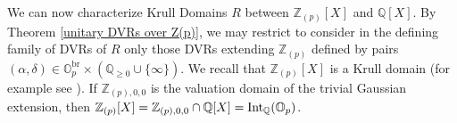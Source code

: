 \documentclass[10pt]{article}
\numberwithin{equation}{section}
\theoremstyle{definition}
\theoremstyle{definition}
\newcommand{\Q}{\mathbb{Q}}
\newcommand{\Z}{\mathbb{Z}}
\renewcommand{\O}{\mathbb{O}}
\newcommand{\Int}{\textnormal{Int}}
\newcommand{\IntQ}{\Int_{\Q}}
\newcommand{\oQp}{\overline{\Q_p}}
\newcommand{\br}{\text{br}}
\begin{document}

We can now characterize Krull Domains $R$ between $\Z_{(p)}[X]$ and $\Q[X]$. By Theorem \ref{unitary DVRs over Z(p)}, we may restrict to consider in the defining family of DVRs of $R$  only those DVRs extending $\Z_{(p)}$ defined by  pairs $(\alpha,\delta)\in\O_p^{\br}\times(\Q_{\geq0}\cup\{\infty\})$.
We recall that  $\Z_{(p)}[X]$ is a Krull domain (for example see \cite[Proposition 1.6]{Fossum}).
If $\Z_{(p),0,0}$ is the valuation domain of the trivial Gaussian extension, then $\Z_{(p)}[X]=\Z_{(p),0,0}\cap\Q[X]=\IntQ(\O_p)$.

\end{document}
